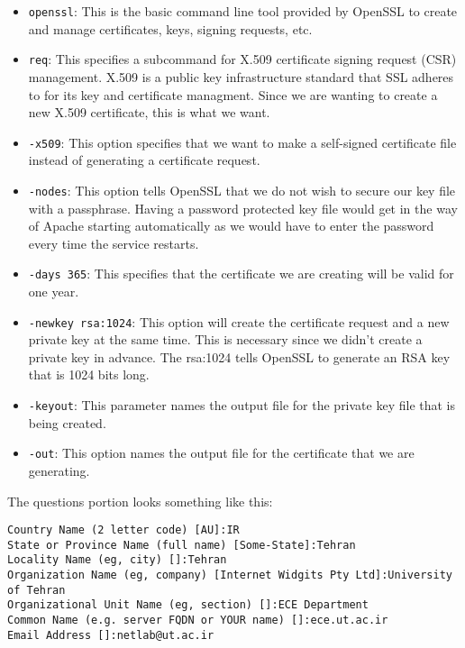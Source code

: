 \documentclass{../UTNetLab}
\begin{document}
        \begin{itemize}
            \item \lstinline{openssl}: This is the basic command line tool provided by OpenSSL to create and manage certificates, keys, signing requests, etc.
            \item \lstinline{req}: This specifies a subcommand for X.509 certificate signing request (CSR) management. X.509 is a public key infrastructure standard that SSL adheres to for its key and certificate managment. Since we are wanting to create a new X.509 certificate, this is what we want.
            \item \lstinline{-x509}: This option specifies that we want to make a self-signed certificate file instead of generating a certificate request.
            \item \lstinline{-nodes}: This option tells OpenSSL that we do not wish to secure our key file with a passphrase. Having a password protected key file would get in the way of Apache starting automatically as we would have to enter the password every time the service restarts.
            \item \lstinline{-days 365}: This specifies that the certificate we are creating will be valid for one year.
            \item \lstinline{-newkey rsa:1024}: This option will create the certificate request and a new private key at the same time. This is necessary since we didn't create a private key in advance. The rsa:1024 tells OpenSSL to generate an RSA key that is 1024 bits long.
            \item \lstinline{-keyout}: This parameter names the output file for the private key file that is being created.
            \item \lstinline{-out}: This option names the output file for the certificate that we are generating.    
        \end{itemize}

    The questions portion looks something like this:
    {\small
    \begin{verbatim}
Country Name (2 letter code) [AU]:IR 
State or Province Name (full name) [Some-State]:Tehran 
Locality Name (eg, city) []:Tehran 
Organization Name (eg, company) [Internet Widgits Pty Ltd]:University of Tehran 
Organizational Unit Name (eg, section) []:ECE Department 
Common Name (e.g. server FQDN or YOUR name) []:ece.ut.ac.ir 
Email Address []:netlab@ut.ac.ir 
    \end{verbatim}}
\end{document}
